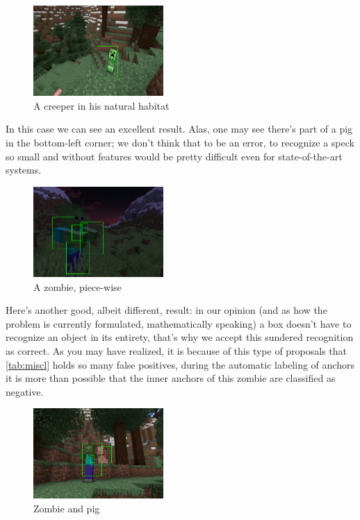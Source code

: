 \documentclass[10pt,journal,cspaper,compsoc]{IEEEtran}
\begin{document}
    \begin{figure}[h]
        \centering
        \includegraphics[width=0.44\textwidth]{images/nice_creeper.png}
        \caption{A creeper in his natural habitat}
    \end{figure}

    In this case we can see an excellent result. Alas, one may see there's part of a pig in the bottom-left corner; we don't think that to be an error, to recognize a speck so small and without features would be pretty difficult even for state-of-the-art systems.

    \begin{figure}[h]
        \centering
        \includegraphics[width=0.44\textwidth]{images/sundered_zombie.png}
        \caption{A zombie, piece-wise}
    \end{figure}

    Here's another good, albeit different, result: in our opinion (and as how the problem is currently formulated, mathematically speaking) a box doesn't have to recognize an object in its entirety,  that's why we accept this sundered recognition as correct. As you may have realized, it is because of this type of proposals that \ref{tab:miscl} holds so many false positives, during the automatic labeling of anchors it is more than possible that the inner anchors of this zombie are classified as negative.

    \begin{figure}[h]
        \centering
        \includegraphics[width=0.44\textwidth]{images/zombie_and_pig.png}
        \caption{Zombie and pig}
    \end{figure}
\end{document}
